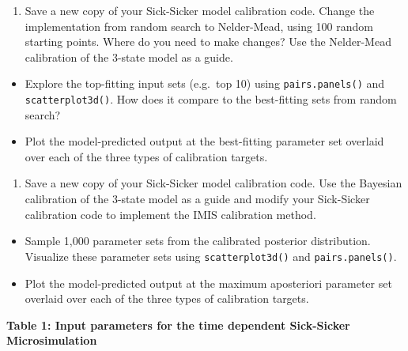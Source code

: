 \documentclass[
]{article}
\providecommand{\tightlist}{%
  \setlength{\itemsep}{0pt}\setlength{\parskip}{0pt}}
\begin{document}
\begin{enumerate}
\def\labelenumi{\arabic{enumi}.}
\setcounter{enumi}{2}
\tightlist
\item
  Save a new copy of your Sick-Sicker model calibration code. Change the
  implementation from random search to Nelder-Mead, using 100 random
  starting points. Where do you need to make changes? Use the
  Nelder-Mead calibration of the 3-state model as a guide.
\end{enumerate}

\begin{itemize}
\item
  Explore the top-fitting input sets (e.g.~top 10) using
  \texttt{pairs.panels()} and \texttt{scatterplot3d()}. How does it
  compare to the best-fitting sets from random search?
\item
  Plot the model-predicted output at the best-fitting parameter set
  overlaid over each of the three types of calibration targets.
\end{itemize}

\begin{enumerate}
\def\labelenumi{\arabic{enumi}.}
\setcounter{enumi}{3}
\tightlist
\item
  Save a new copy of your Sick-Sicker model calibration code. Use the
  Bayesian calibration of the 3-state model as a guide and modify your
  Sick-Sicker calibration code to implement the IMIS calibration method.
\end{enumerate}

\begin{itemize}
\item
  Sample 1,000 parameter sets from the calibrated posterior
  distribution. Visualize these parameter sets using
  \texttt{scatterplot3d()} and \texttt{pairs.panels()}.
\item
  Plot the model-predicted output at the maximum aposteriori parameter
  set overlaid over each of the three types of calibration targets.
\end{itemize}

\textbf{Table 1: Input parameters for the time dependent Sick-Sicker
Microsimulation }
\end{document}
